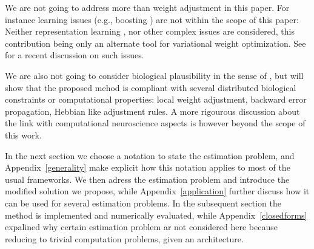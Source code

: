 We are not going to address more than weight adjustment in this paper.
For instance learning issues (e.g., boosting
\cite{Freund2003Efficient}) are not within the scope of this paper:
Neither representation learning \cite{Bengio2012Representation}, nor other
complex issues \cite{Goodfellow2016Deep} are considered, this
contribution being only an alternate tool for variational weight
optimization. See \cite{Fdrumond2017} for a recent discussion on 
such issues.

We are also not going to consider biological plausibility in the sense
of \cite{Bengio2016Towards}, but will show that the proposed mehod is
compliant with several distributed biological constraints or
computational properties: local weight adjustment, backward error
propagation, Hebbian like adjustment rules. A more rigourous
discussion about the link with computational neuroscience aspects is
however beyond the scope of this work.

In the next section we choose a notation to state the estimation
problem, and Appendix~\ref{generality} make explicit how this notation
applies to most of the usual frameworks. We then adress the estimation
problem and introduce the modified solution we propose, while
Appendix~\ref{application} further discuss how it can be used for
several estimation problems. In the subsequent section the method is
implemented and numerically evaluated, while
Appendix~\ref{closedforms} expalined why certain estimation problem ar
not considered here because reducing to trivial computation problems,
given an architecture.
